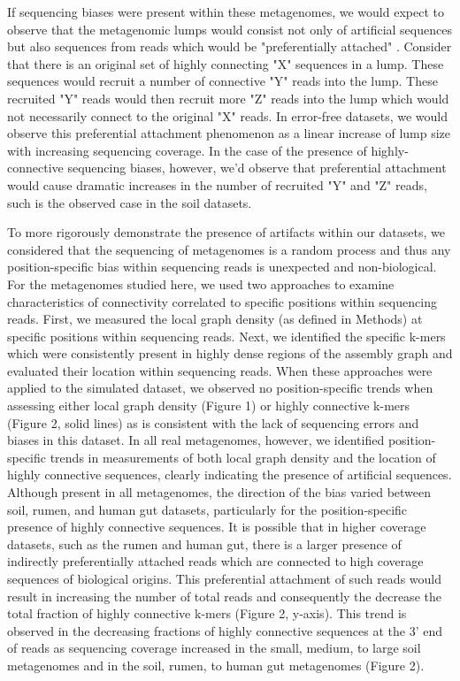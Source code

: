 \documentclass[10pt]{article}
\begin{document}
If sequencing biases were present within these metagenomes, we would expect to observe that the metagenomic lumps would consist not only of artificial sequences but also sequences from reads which would be "preferentially attached" \cite{Barabasi:1999p1083}.  Consider that there is an original set of highly connecting "X" sequences in a lump.  These sequences would recruit a number of connective "Y" reads into the lump.  These recruited "Y" reads would then recruit more "Z" reads into the lump which would not necessarily connect to the original "X" reads.  In error-free datasets, we would observe this preferential attachment phenomenon as a linear increase of lump size with increasing sequencing coverage.  In the case of the presence of highly-connective sequencing biases, however, we'd observe that preferential attachment would cause dramatic increases in the number of recruited "Y" and "Z" reads, such is the observed case in the soil datasets.   

To more rigorously demonstrate the presence of artifacts within our datasets, we considered that the sequencing of metagenomes is a random process and thus any position-specific bias within sequencing reads is unexpected and non-biological.   For the metagenomes studied here, we used two approaches to examine characteristics of connectivity correlated to specific positions within sequencing reads.  First, we measured the local graph density (as defined in Methods) at specific positions within sequencing reads.  Next, we identified the specific k-mers which were consistently present in highly dense regions of the assembly graph and evaluated their location within sequencing reads.  When these approaches were applied to the simulated dataset, we observed no position-specific trends when assessing either local graph density (Figure 1) or highly connective k-mers (Figure 2, solid lines) as is consistent with the lack of sequencing errors and biases in this dataset.  In all real metagenomes, however, we identified position-specific trends in measurements of both local graph density and the location of highly connective sequences, clearly indicating the presence of artificial sequences.  Although present in all metagenomes, the direction of the bias varied between soil, rumen, and human gut datasets, particularly for the position-specific presence of highly connective sequences.  It is possible that in higher coverage datasets, such as the rumen and human gut, there is a larger presence of indirectly preferentially attached reads which are connected to high coverage sequences of biological origins.  This preferential attachment of such reads would result in increasing the number of total reads and consequently the decrease the total fraction of highly connective k-mers (Figure 2, y-axis).  This trend is observed in the decreasing fractions of highly connective sequences at the 3' end of reads as sequencing coverage increased in the small, medium, to large soil metagenomes and in the soil, rumen, to human gut metagenomes (Figure 2).
\end{document}
